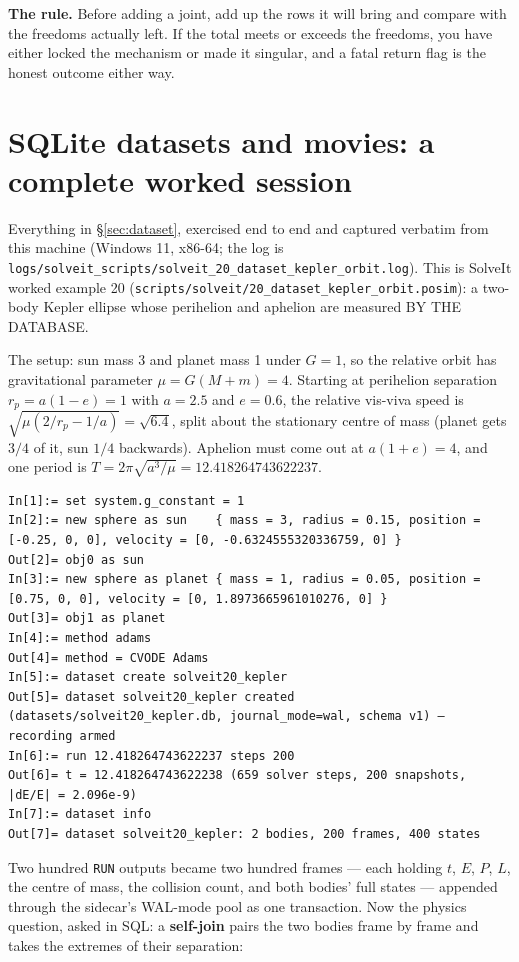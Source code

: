 \documentclass[11pt]{article}
\newcommand{\kw}[1]{\texttt{\uppercase{#1}}}
\newcommand{\code}[1]{\texttt{#1}}
\begin{document}
\textbf{The rule.} Before adding a joint, add up the rows it will bring
and compare with the freedoms actually left. If the total meets or
exceeds the freedoms, you have either locked the mechanism or made it
singular, and a fatal return flag is the honest outcome either way.

\section{SQLite datasets and movies: a complete worked session}
\label{sec:worked-sqlite}

Everything in \S\ref{sec:dataset}, exercised end to end and captured
verbatim from this machine (Windows 11, x86-64; the log is
\code{logs/solveit\_scripts/solveit\_20\_dataset\_kepler\_orbit.log}).
This is SolveIt worked example 20
(\code{scripts/solveit/20\_dataset\_kepler\_orbit.posim}): a two-body
Kepler ellipse whose perihelion and aphelion are measured BY THE
DATABASE.

The setup: sun mass 3 and planet mass 1 under $G = 1$, so the relative
orbit has gravitational parameter $\mu = G(M+m) = 4$. Starting at
perihelion separation $r_p = a(1-e) = 1$ with $a = 2.5$ and $e = 0.6$,
the relative vis-viva speed is $\sqrt{\mu(2/r_p - 1/a)} = \sqrt{6.4}$,
split about the stationary centre of mass (planet gets $3/4$ of it,
sun $1/4$ backwards). Aphelion must come out at $a(1+e) = 4$, and one
period is $T = 2\pi\sqrt{a^3/\mu} = 12.418264743622237$.

\begin{lstlisting}
In[1]:= set system.g_constant = 1
In[2]:= new sphere as sun    { mass = 3, radius = 0.15, position = [-0.25, 0, 0], velocity = [0, -0.6324555320336759, 0] }
Out[2]= obj0 as sun
In[3]:= new sphere as planet { mass = 1, radius = 0.05, position = [0.75, 0, 0], velocity = [0, 1.8973665961010276, 0] }
Out[3]= obj1 as planet
In[4]:= method adams
Out[4]= method = CVODE Adams
In[5]:= dataset create solveit20_kepler
Out[5]= dataset solveit20_kepler created (datasets/solveit20_kepler.db, journal_mode=wal, schema v1) — recording armed
In[6]:= run 12.418264743622237 steps 200
Out[6]= t = 12.418264743622238 (659 solver steps, 200 snapshots, |dE/E| = 2.096e-9)
In[7]:= dataset info
Out[7]= dataset solveit20_kepler: 2 bodies, 200 frames, 400 states
\end{lstlisting}

Two hundred \kw{run} outputs became two hundred frames --- each
holding $t$, $E$, $P$, $L$, the centre of mass, the collision count,
and both bodies' full states --- appended through the sidecar's
WAL-mode pool as one transaction. Now the physics question, asked in
SQL: a \textbf{self-join} pairs the two bodies frame by frame and
takes the extremes of their separation:
\end{document}
